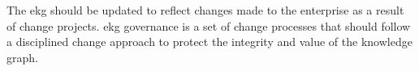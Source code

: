%
%
The \gls{ekg} should be updated to reflect changes made to the enterprise as a result of change projects.
\gls{ekg} governance is a set of change processes that
should follow a disciplined change approach to protect the integrity and value of the knowledge graph.